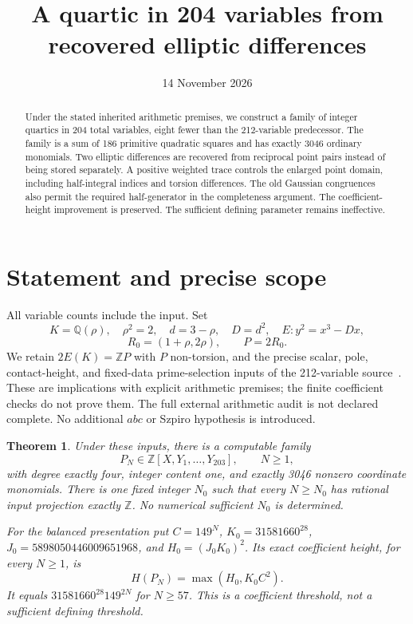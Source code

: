 \documentclass[11pt,a4paper]{article}
\title{A quartic in 204 variables from recovered elliptic differences}
\author{}\date{14 November 2026}
\newtheorem{theorem}{Theorem}[section]\newtheorem{lemma}[theorem]{Lemma}\newtheorem{proposition}[theorem]{Proposition}
\newcommand{\Q}{\mathbb Q}\newcommand{\Z}{\mathbb Z}\DeclareMathOperator{\Tr}{Tr}
\begin{document}
\maketitle
\begin{abstract}
Under the stated inherited arithmetic premises, we construct a family
of integer quartics in 204 total variables, eight fewer than the
212-variable predecessor. The family is a sum of 186 primitive
quadratic squares and has exactly 3046 ordinary monomials. Two elliptic
differences are recovered from reciprocal point pairs instead of being
stored separately. A positive weighted trace controls the enlarged
point domain, including half-integral indices and torsion differences.
The old Gaussian congruences also permit the required half-generator
in the completeness argument. The coefficient-height improvement is
preserved. The sufficient defining parameter remains ineffective.
\end{abstract}

\section{Statement and precise scope}
All variable counts include the input. Set
\[
 K=\Q(\rho),\quad \rho^2=2,\quad d=3-\rho,\quad D=d^2,
 \quad E:y^2=x^3-Dx,
\]
\[
 R_0=(1+\rho,2\rho),\qquad P=2R_0.
\]
We retain $2E(K)=\Z P$ with $P$ non-torsion, and the precise
scalar, pole, contact-height, and fixed-data prime-selection inputs
of the 212-variable source~\cite{Parent}. These are implications with
explicit arithmetic premises; the finite coefficient checks do not
prove them. The full external arithmetic audit is not declared complete.
No additional $abc$ or Szpiro hypothesis is introduced.

\begin{theorem}\label{thm:main}
Under these inputs, there is a computable family
\[
 P_N\in\Z[X,Y_1,\ldots,Y_{203}],\qquad N\ge1,
\]
with degree exactly four, integer content one, and exactly 3046 nonzero
coordinate monomials. There is one fixed integer $N_0$ such that every
$N\ge N_0$ has rational input projection exactly $\Z$.
No numerical sufficient $N_0$ is determined.

For the balanced presentation put $C=149^N$, $K_0=31581660^{28}$,
$J_0=5898050446009651968$, and $H_0=(J_0K_0)^2$. Its exact coefficient
height, for every $N\ge1$, is
\[
                    H(P_N)=\max(H_0,K_0C^2).
\]
It equals $31581660^{28}149^{2N}$ for $N\ge57$. This is a coefficient
threshold, not a sufficient defining threshold.
\end{theorem}
\end{document}
